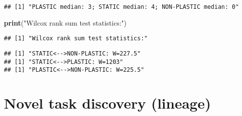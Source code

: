 \documentclass[]{book}
\newenvironment{Shaded}{\begin{snugshade}}{\end{snugshade}}
\newcommand{\ControlFlowTok}[1]{\textcolor[rgb]{0.13,0.29,0.53}{\textbf{#1}}}
\newcommand{\DataTypeTok}[1]{\textcolor[rgb]{0.13,0.29,0.53}{#1}}
\newcommand{\DecValTok}[1]{\textcolor[rgb]{0.00,0.00,0.81}{#1}}
\newcommand{\FloatTok}[1]{\textcolor[rgb]{0.00,0.00,0.81}{#1}}
\newcommand{\KeywordTok}[1]{\textcolor[rgb]{0.13,0.29,0.53}{\textbf{#1}}}
\newcommand{\NormalTok}[1]{#1}
\newcommand{\OperatorTok}[1]{\textcolor[rgb]{0.81,0.36,0.00}{\textbf{#1}}}
\newcommand{\OtherTok}[1]{\textcolor[rgb]{0.56,0.35,0.01}{#1}}
\newcommand{\StringTok}[1]{\textcolor[rgb]{0.31,0.60,0.02}{#1}}
\begin{document}
\begin{verbatim}
## [1] "PLASTIC median: 3; STATIC median: 4; NON-PLASTIC median: 0"
\end{verbatim}

\begin{Shaded}
\begin{Highlighting}[]
\KeywordTok{print}\NormalTok{(}\StringTok{"Wilcox rank sum test statistics:"}\NormalTok{)}
\end{Highlighting}
\end{Shaded}

\begin{verbatim}
## [1] "Wilcox rank sum test statistics:"
\end{verbatim}

\begin{Shaded}
\end{Shaded}

\begin{verbatim}
## [1] "STATIC<-->NON-PLASTIC: W=227.5"
## [1] "STATIC<-->PLASTIC: W=1203"
## [1] "PLASTIC<-->NON-PLASTIC: W=225.5"
\end{verbatim}

\hypertarget{novel-task-discovery-lineage}{%
\section{Novel task discovery (lineage)}\label{novel-task-discovery-lineage}}
\end{document}
